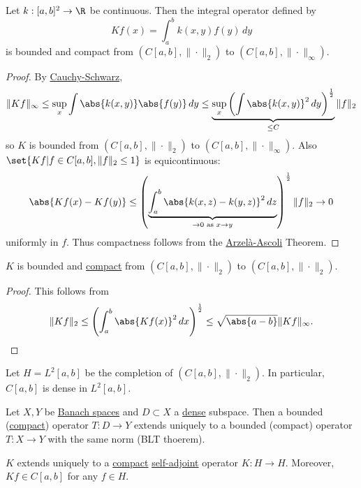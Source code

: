 \documentclass{article}
\begin{document}
\begin{lemma}
    Let $k:[a,b]^2 \to \R$ be continuous.
    Then the integral operator defined by
    \begin{equation*}
        K f(x) = \int_a^b k(x,y) f(y) \, dy
    \end{equation*}
    is bounded and compact from $(C[a,b],\|\cdot\|_2)$ to $(C[a,b],\|\cdot\|_\infty)$.
\end{lemma}

\begin{proof}
    By \hyperlink{thm:cs}{Cauchy-Schwarz},
    \begin{equation*}
        \|Kf\|_\infty \leq \sup_x \int \abs{k(x,y)} \abs{f(y)} \, dy \leq \underbrace{\sup_x \left(\int \abs{k(x,y)}^2 \, dy\right)^\frac{1}{2}}_{\leq C} \|f\|_2
    \end{equation*}
    so $K$ is bounded from $(C[a,b],\|\cdot\|_2)$ to $(C[a,b],\|\cdot\|_\infty)$.
    Also $\set{K f | f \in C[a,b], \|f\|_2 \leq 1}$ is equicontinuous:
    \begin{equation*}
        \abs{K f(x) - K f(y)} \leq \left(\underbrace{\int_a^b \abs{k(x,z) - k(y,z)}^2 \, dz}_{\to 0 \text{ as } x \to y}\right)^\frac{1}{2} \|f\|_2 \to 0
    \end{equation*}
    uniformly in $f$.
    Thus compactness follows from the \hyperlink{thm:aa}{Arzel\`a-Ascoli} Theorem.
\end{proof}

\begin{cor}
    $K$ is bounded and \hyperlink{def:compact}{compact} from $(C[a,b], \|\cdot\|_2)$ to $(C[a,b], \|\cdot\|_2)$.
\end{cor}

\begin{proof}
    This follows from
    \begin{equation*}
        \|Kf\|_2 \leq \left(\int_a^b \abs{K f(x)}^2 \, dx\right)^\frac{1}{2} \leq \sqrt{\abs{a-b}} \|K f\|_\infty. \qedhere
    \end{equation*}
\end{proof}

Let $H = L^2[a,b]$ be the completion of $(C[a,b], \|\cdot\|_2)$.
In particular, $C[a,b]$ is dense in $L^2[a,b]$.

\begin{fact}
    Let $X,Y$ be \hyperlink{def:banach}{Banach spaces} and $D \subset X$ a \hyperlink{def:dense}{dense} subspace.
    Then a bounded (\hyperlink{def:compact}{compact}) operator $T:D \to Y$ extends uniquely to a bounded (compact) operator $T:X \to Y$ with the same norm (BLT thoerem).
\end{fact}
\begin{cor}
    $K$ extends uniquely to a \hyperlink{def:compact}{compact} \hyperlink{def:normalMap}{self-adjoint} operator $K: H \to H$.
    Moreover, $Kf \in C[a,b]$ for any $f \in H$.
\end{cor}
\end{document}
